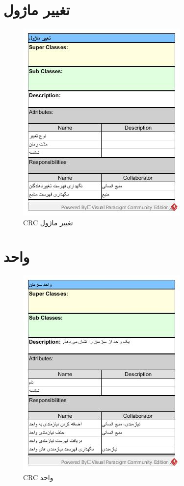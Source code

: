 \section{تغییر ماژول}
\begin{figure}[H]
	\centering
	\includegraphics[scale=1]{img/crc/ModuleModification}
	\caption{CRC تغییر ماژول }
\end{figure}

\section{واحد}
\begin{figure}[H]
	\centering
	\includegraphics[scale=1]{img/crc/Unit}
	\caption{CRC واحد }
\end{figure}


